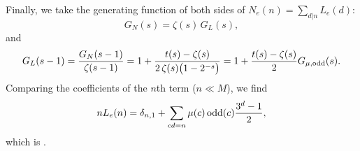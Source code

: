 \documentclass[preprint]{revtex4-1}
\begin{document}
Finally, we take the generating function of both sides of
 $N_e(n) = \sum_{d|n} L_e(d)$:
\[
  G_N(s) = \zeta(s) \, G_L(s),
\]
and
\begin{align*}
  G_L(s-1) = \frac{G_N(s - 1)}{\zeta(s-1)}
       = 1
        + \frac{ t(s) - \zeta(s) }
          {2 \, \zeta(s) \big(1 - 2^{-s}\big)}
       = 1 + \frac{t(s) - \zeta(s)}{2} G_{\mu, \mathrm{odd}}(s).
\end{align*}
Comparing the coefficients of the $n$th term ($n \ll M$),
  we find
\[
  n L_e(n) = \delta_{n,1} + \sum_{cd = n} \mu(c) \, \mathrm{odd}(c) \frac{3^d-1}{2},
\]
which is 
\big[also note $\delta_{n,1} = \sum_{c|n}\mu(c)$\big].
\end{document}
